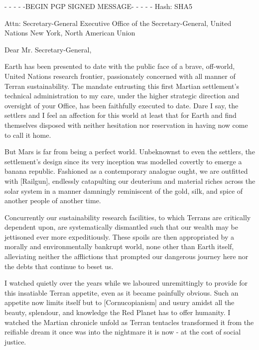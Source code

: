 
- - - - -BEGIN PGP SIGNED MESSAGE- - - - -
Hash: SHA5

Attn: Secretary-General
Executive Office of the Secretary-General, United Nations
New York, North American Union
\blank

Dear Mr. Secretary-General,

Earth has been presented to date with the public face of a brave, off-world, United Nations research frontier, passionately concerned with all manner of Terran sustainability. The mandate entrusting this first Martian settlement's technical administration to my care, under the higher strategic direction and oversight of your Office, has been faithfully executed to date. Dare I say, the settlers and I feel an affection for this world at least that for Earth and find themselves disposed with neither hesitation nor reservation in having now come to call it home.

But Mars is far from being a perfect world. Unbeknownst to even the settlers, the settlement's design since its very inception was modelled covertly to emerge a banana republic. Fashioned as a contemporary analogue ought, we are outfitted with [Railgun], endlessly catapulting our deuterium and material riches across the solar system in a manner damningly reminiscent of the gold, silk, and spice of another people of another time.

Concurrently our sustainability research facilities, to which Terrans are critically dependent upon, are systematically dismantled such that our wealth may be jettisoned ever more expeditiously. These spoils are then appropriated by a morally and environmentally bankrupt world, none other than Earth itself, alleviating neither the afflictions that prompted our dangerous journey here nor the debts that continue to beset us.

I watched quietly over the years while we laboured unremittingly to provide for this insatiable Terran appetite, even as it became painfully obvious. Such an appetite now limits itself but to [Cornucopianism] and usury amidst all the beauty, splendour, and knowledge the Red Planet has to offer humanity. I watched the Martian chronicle unfold as Terran tentacles transformed it from the reifiable dream it once was into the nightmare it is now - at the cost of social justice. 

